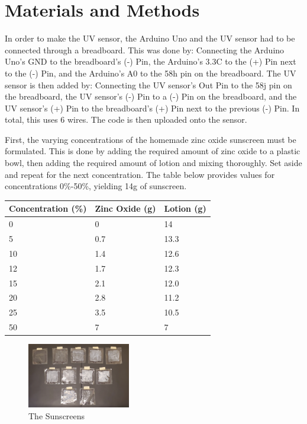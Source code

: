 \documentclass{article}
\begin{document}
\section{Materials and Methods}
In order to make the UV sensor, the Arduino Uno and the UV sensor had to be connected through a breadboard. This was done by: Connecting the Arduino Uno’s GND to the breadboard’s (-) Pin, the Arduino’s 3.3C to the (+) Pin next to the (-) Pin, and the Arduino’s A0 to the 58h pin on the breadboard. The UV sensor is then added by: Connecting the UV sensor’s Out Pin to the 58j pin on the breadboard, the UV sensor’s (-) Pin to a (-) Pin on the breadboard, and the UV sensor’s (+) Pin to the breadboard’s (+) Pin next to the previous (-) Pin. In total, this uses 6 wires. The code is then uploaded onto the sensor.

First, the varying concentrations of the homemade zinc oxide sunscreen must be formulated. This is done by adding the required amount of zinc oxide to a plastic bowl, then adding the required amount of lotion and mixing thoroughly. Set aside and repeat for the next concentration. The table below provides values for concentrations 0\%-50\%, yielding 14g of sunscreen.
\begin{center}
\begin{tabular}{ | m{9em} | m{7em} | m{5em} | }
    \hline
    Concentration (\%)& Zinc Oxide (g)& Lotion (g) \\
    \hline
    0 & 0 & 14 \\
    \hline
    5 & 0.7 & 13.3 \\
    \hline
    10 & 1.4 & 12.6 \\
    \hline
    12 & 1.7 & 12.3 \\
    \hline
    15 & 2.1 & 12.0 \\
    \hline
    20 & 2.8 & 11.2 \\
    \hline
    25 & 3.5 & 10.5 \\
    \hline
    50 & 7 & 7 \\
    \hline
\end{tabular}
\end{center}
\begin{figure}
  \centering
  \caption{The Sunscreens}
  \includegraphics[width=0.4\textwidth]{Sunscreens.jpg}
\end{figure}
\end{document}
